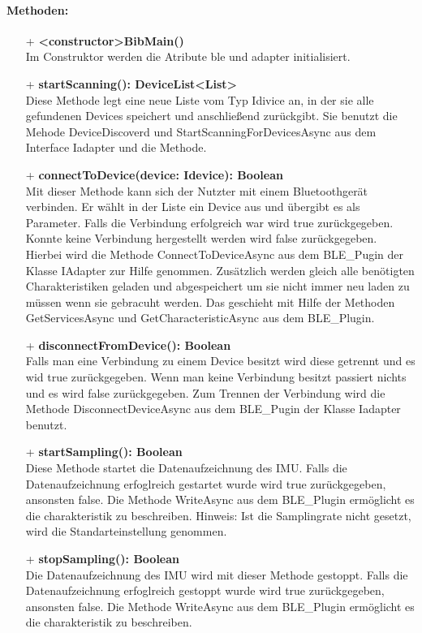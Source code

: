 \documentclass[a4paper,12pt]{article}
\begin{document}
\paragraph{Methoden:}
\begin{itemize}
	\item[+] \textbf{<constructor>BibMain()}\\ Im Construktor werden die Atribute ble und adapter initialisiert.
	\item[+] \textbf{startScanning(): DeviceList<List>}\\ Diese Methode legt eine neue Liste vom Typ Idivice an, in der sie alle gefundenen Devices speichert und anschließend zurückgibt. Sie benutzt die Mehode DeviceDiscoverd und StartScanningForDevicesAsync aus dem Interface Iadapter und die Methode.
	\item[+] \textbf{connectToDevice(device: Idevice): Boolean}\\ Mit dieser Methode kann sich der Nutzter mit einem Bluetoothgerät verbinden. Er wählt in der Liste  ein Device aus und übergibt es als Parameter. Falls die Verbindung erfolgreich war wird true zurückgegeben. Konnte keine Verbindung hergestellt werden wird false zurückgegeben. Hierbei wird die Methode ConnectToDeviceAsync aus dem BLE\_Pugin der Klasse IAdapter zur Hilfe genommen. Zusätzlich werden gleich alle benötigten Charakteristiken geladen und abgespeichert um sie nicht immer neu laden zu müssen wenn sie gebracuht werden. Das geschieht mit Hilfe der Methoden GetServicesAsync und GetCharacteristicAsync aus dem BLE\_Plugin.
	\item[+] \textbf{disconnectFromDevice(): Boolean}\\ Falls man eine Verbindung zu einem Device besitzt wird diese getrennt und es wid true zurückgegeben. Wenn man keine Verbindung besitzt passiert nichts und es wird false zurückgegeben. Zum Trennen der Verbindung wird die Methode DisconnectDeviceAsync aus dem BLE\_Pugin der Klasse Iadapter benutzt.
	\item[+] \textbf{startSampling(): Boolean}\\ Diese Methode startet die Datenaufzeichnung des IMU. Falls die Datenaufzeichnung erfoglreich gestartet wurde wird true zurückgegeben, ansonsten false. Die Methode WriteAsync aus dem BLE\_Plugin ermöglicht es die charakteristik zu beschreiben. Hinweis: Ist die Samplingrate nicht gesetzt, wird die Standarteinstellung genommen.
	\item[+] \textbf{stopSampling(): Boolean}\\Die Datenaufzeichnung des IMU wird mit dieser Methode gestoppt. Falls die Datenaufzeichnung erfoglreich gestoppt wurde wird true zurückgegeben, ansonsten false. Die Methode WriteAsync aus dem BLE\_Plugin ermöglicht es die charakteristik zu beschreiben.

\end{itemize}
\end{document}
